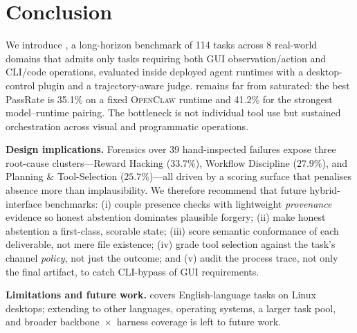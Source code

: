 \section{Conclusion}
\label{sec:conclusion}

We introduce \Eyeson{}, a long-horizon benchmark of 114 tasks across 8 real-world domains that admits only tasks requiring both GUI observation/action and CLI/code operations, evaluated inside deployed agent runtimes with a desktop-control plugin and a trajectory-aware judge. \Eyeson{} remains far from saturated: the best PassRate is 35.1\% on a fixed \textsc{OpenClaw} runtime and 41.2\% for the strongest model--runtime pairing. The bottleneck is not individual tool use but sustained orchestration across visual and programmatic operations.

\smallskip
\noindent\textbf{Design implications.}
Forensics over $39$ hand-inspected failures expose three root-cause clusters---Reward Hacking ($33.7\%$), Workflow Discipline ($27.9\%$), and Planning \& Tool-Selection ($25.7\%$)---all driven by a scoring surface that penalises absence more than implausibility. We therefore recommend that future hybrid-interface benchmarks: (i) couple presence checks with lightweight \emph{provenance} evidence so honest abstention dominates plausible forgery; (ii) make honest abstention a first-class, scorable state; (iii) score semantic conformance of each deliverable, not mere file existence; (iv) grade tool selection against the task's channel \emph{policy}, not just the outcome; and (v) audit the process trace, not only the final artifact, to catch CLI-bypass of GUI requirements.

\smallskip
\noindent\textbf{Limitations and future work.}
\Eyeson{} covers English-language tasks on Linux desktops; extending to other languages, operating systems, a larger task pool, and broader backbone~$\times$~harness coverage is left to future work.
